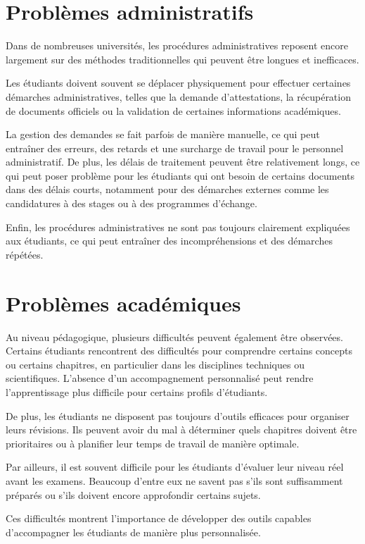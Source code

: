 \documentclass[12pt,a4paper]{report}
\begin{document}
\section{Problèmes administratifs}
Dans de nombreuses universités, les procédures administratives reposent encore largement sur des méthodes traditionnelles qui peuvent être longues et inefficaces.

Les étudiants doivent souvent se déplacer physiquement pour effectuer certaines démarches administratives, telles que la demande d'attestations, la récupération de documents officiels ou la validation de certaines informations académiques.

La gestion des demandes se fait parfois de manière manuelle, ce qui peut entraîner des erreurs, des retards et une surcharge de travail pour le personnel administratif.
De plus, les délais de traitement peuvent être relativement longs, ce qui peut poser problème pour les étudiants qui ont besoin de certains documents dans des délais courts, notamment pour des démarches externes comme les candidatures à des stages ou à des programmes d'échange.

Enfin, les procédures administratives ne sont pas toujours clairement expliquées aux étudiants, ce qui peut entraîner des incompréhensions et des démarches répétées.

\section{Problèmes académiques}
Au niveau pédagogique, plusieurs difficultés peuvent également être observées. Certains étudiants rencontrent des difficultés pour comprendre certains concepts ou certains chapitres, en particulier dans les disciplines techniques ou scientifiques. L'absence d'un accompagnement personnalisé peut rendre l'apprentissage plus difficile pour certains profils d'étudiants.

De plus, les étudiants ne disposent pas toujours d'outils efficaces pour organiser leurs révisions. Ils peuvent avoir du mal à déterminer quels chapitres doivent être prioritaires ou à planifier leur temps de travail de manière optimale.

Par ailleurs, il est souvent difficile pour les étudiants d'évaluer leur niveau réel avant les examens. Beaucoup d'entre eux ne savent pas s'ils sont suffisamment préparés ou s'ils doivent encore approfondir certains sujets.

Ces difficultés montrent l'importance de développer des outils capables d'accompagner les étudiants de manière plus personnalisée.
\end{document}

